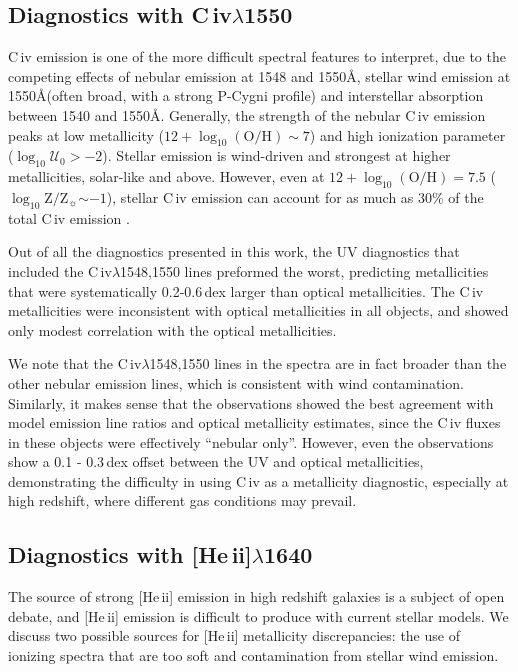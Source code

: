 \documentclass[preprint2]{aastex62}
\newcommand{\heii}{[He\,{\sc ii}]\xspace}
\newcommand{\civ}{C\,{\sc iv}\xspace}
\newcommand{\logten}{\ensuremath{\log_{10}}}
\newcommand{\logZ}{\ensuremath{\logten \mathrm{Z}/\mathrm{Z}_{\sun}}\xspace}
\newcommand{\logOH}{\ensuremath{\logten (\mathrm{O}/\mathrm{H})}\xspace}
\newcommand{\ang}{\ensuremath{\mbox{\AA}}\xspace}
\newcommand{\logU}{\ensuremath{\logten \mathcal{U}_0}}
\begin{document}
\subsection{Diagnostics with \civ$\lambda$1550}

\civ emission is one of the more difficult spectral features to interpret, due to the competing effects of nebular emission at 1548 and 1550\ang, stellar wind emission at 1550\ang (often broad, with a strong P-Cygni profile) and interstellar absorption between 1540 and 1550\ang. Generally, the strength of the nebular \civ emission peaks at low metallicity ($12+\logOH \sim 7$) and high ionization parameter (\logU$>-2$). Stellar emission is wind-driven and strongest at higher metallicities, solar-like and above. However, even at $12+\logOH = 7.5$ (\logZ$\sim-1$), stellar \civ emission can account for as much as 30\% of the total \civ emission \citep{Byler+2018}.

Out of all the diagnostics presented in this work, the UV diagnostics that included the \civ$\lambda$1548,1550 lines preformed the worst, predicting metallicities that were systematically 0.2-0.6\,dex larger than optical metallicities. The \civ metallicities were inconsistent with optical metallicities in all objects, and showed only modest correlation with the optical metallicities.

We note that the \civ$\lambda$1548,1550 lines in the \citet{Berg+2016} spectra are in fact broader than the other nebular emission lines, which is consistent with wind contamination. Similarly, it makes sense that the \citet{Senchyna+2017} observations showed the best agreement with model emission line ratios and optical metallicity estimates, since the \civ fluxes in these objects were effectively ``nebular only''. However, even the \citet{Senchyna+2017} observations show a 0.1 - 0.3\,dex offset between the UV and optical metallicities, demonstrating the difficulty in using \civ as a metallicity diagnostic, especially at high redshift, where different gas conditions may prevail.

\subsection{Diagnostics with \heii$\lambda$1640}

The source of strong \heii emission in high redshift galaxies is a subject of open debate, and \heii emission is difficult to produce with current stellar models. We discuss two possible sources for \heii metallicity discrepancies: the use of ionizing spectra that are too soft and contamination from stellar wind emission.
\end{document}
